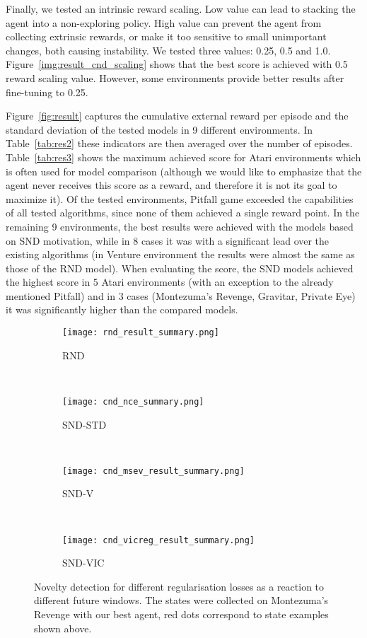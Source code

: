 \documentclass[a4paper,11pt]{elsarticle}
\begin{document}
Finally, we tested an intrinsic reward scaling. Low value can lead to stacking the agent into a non-exploring policy. High value can prevent the agent from collecting extrinsic rewards, or make it too sensitive to small unimportant changes, both causing instability. We tested three values: 0.25, 0.5 and 1.0. Figure~\ref{img:result_cnd_scaling} shows that the best score is achieved with 0.5 reward scaling value. However, some environments provide better results after fine-tuning to 0.25.

Figure~\ref{fig:result} captures the cumulative external reward per episode and the standard deviation of the tested models in 9 different environments. In Table~\ref{tab:res2} these indicators are then averaged over the number of episodes. Table~\ref{tab:res3} shows the maximum achieved score for Atari environments which is often used for model comparison (although we would like to emphasize that the agent never receives this score as a reward, and therefore it is not its goal to maximize it).
Of the tested environments, Pitfall game exceeded the capabilities of all tested algorithms, since none of them achieved a single reward point. In the remaining 9 environments, the best results were achieved with the models based on SND motivation, while in 8 cases it was with a significant lead over the existing algorithms (in Venture environment the results were almost the same as those of the RND model). When evaluating the score, the SND models achieved the highest score in 5 Atari environments (with an exception to the already mentioned Pitfall) and in 3 cases (Montezuma's Revenge, Gravitar, Private Eye) it was significantly higher than the compared models.

\begin{figure*}[t!]
  \begin{subfigure}{1.0\textwidth}
    \centering\texttt{[image: rnd\_result\_summary.png]}
    \caption{RND}
    \label{fig:nov_rnd_result_summary}
   \end{subfigure}
  \\
  \begin{subfigure}{1.0\textwidth}
    \centering\texttt{[image: cnd\_nce\_summary.png]}
    \caption{SND-STD}
    \label{fig:nov_nce_result_summary}
   \end{subfigure}
  \\
  \begin{subfigure}{1.0\textwidth}
    \centering\texttt{[image: cnd\_msev\_result\_summary.png]}
    \caption{SND-V}
    \label{fig:nov_mse_result_summary}
   \end{subfigure}
  \\
  \begin{subfigure}{1.0\textwidth}
    \centering\texttt{[image: cnd\_vicreg\_result\_summary.png]}
    \caption{SND-VIC}
    \label{fig:nov_vicreg_result_summary}
   \end{subfigure}
\caption{Novelty detection for different regularisation losses as a reaction to different future windows. The states were collected on Montezuma's Revenge with our best agent, red dots correspond to state examples shown above.}
\end{figure*}
\end{document}
